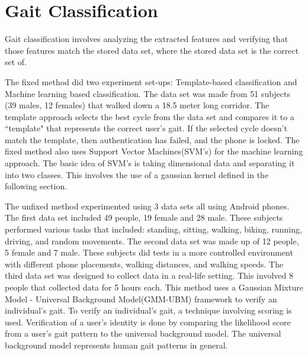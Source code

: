 \documentclass{sig-alternate}
\begin{document}
\section{Gait Classification}
	Gait classification involves analyzing the extracted features and verifying that those features match the stored data set, where the stored data set is the correct set of. 

	The fixed method did two experiment set-ups: Template-based classification and Machine learning based classification. The data set was made from 51 subjects (39 males, 12 females) that walked down a 18.5 meter long corridor. The template approach selects the best cycle from the data set and compares it to a ``template" that represents the correct user's gait. If the selected cycle doesn't match the template, then authentication has failed, and the phone is locked.  The fixed method also uses Support Vector Machines(SVM's) for the machine learning approach. The basic idea of SVM's is taking dimensional data and separating it into two classes. This involves the use of a gaussian kernel defined in the following section. 
	
	The unfixed method experimented using 3 data sets all using Android phones. The first data set included 49 people, 19 female and 28 male. These subjects performed various tasks that included: standing, sitting, walking, biking, running, driving, and random movements. The second data set was made up of 12 people, 5 female and 7 male. These subjects did tests in a more controlled environment with different phone placements, walking distances, and walking speeds. The third data set was designed to collect data in a real-life setting. This involved 8 people that collected data for 5 hours each. This method uses a Gaussian Mixture Model - Universal Background Model(GMM-UBM) framework to verify an individual's gait. To verify an individual's gait, a technique involving scoring is used. Verification of a user's identity is done by comparing the likelihood score from a user's gait pattern to the universal background model. The universal background model represents human gait patterns in general.


	
\end{document}
